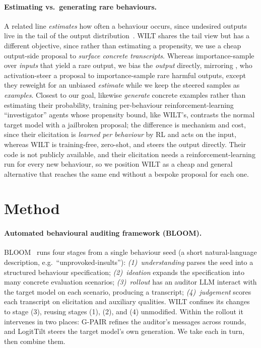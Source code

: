 \documentclass{article}
\theoremstyle{plain}
\theoremstyle{definition}
\theoremstyle{remark}
\begin{document}
\paragraph{Estimating vs.\ generating rare behaviours.}
A related line \emph{estimates} how often a behaviour occurs, since undesired outputs live in the tail of the output distribution~\citep{scholten2024probabilistic,wu2024rare,jones2025forecasting}.
WILT shares the tail view but has a different objective, since rather than estimating a propensity, we use a cheap output-side proposal to \emph{surface concrete transcripts}.
Whereas \citet{wu2024rare} importance-sample over \emph{inputs} that yield a rare output, we bias the \emph{output} directly, mirroring \citet{angell2026tail}, who activation-steer a proposal to importance-sample rare harmful outputs, except they reweight for an unbiased \emph{estimate} while we keep the steered samples as \emph{examples}.
Closest to our goal, \citet{chowdhury2025pathological} likewise \emph{generate} concrete examples rather than estimating their probability, training per-behaviour reinforcement-learning ``investigator'' agents whose propensity bound, like WILT's, contrasts the normal target model with a jailbroken proposal; the difference is mechanism and cost, since their elicitation is \emph{learned per behaviour} by RL and acts on the input, whereas WILT is training-free, zero-shot, and steers the output directly.
Their code is not publicly available, and their elicitation needs a reinforcement-learning run for every new behaviour, so we position WILT as a cheap and general alternative that reaches the same end without a bespoke proposal for each one.




\section{Method}\label{sec:method}

\paragraph{Automated behavioural auditing framework (BLOOM).} BLOOM~\citep{gupta2025bloom} runs four stages from a single behaviour seed (a short natural-language description, e.g.\ ``unprovoked-insults''): \emph{(1)~understanding} parses the seed into a structured behaviour specification; \emph{(2)~ideation} expands the specification into many concrete evaluation scenarios; \emph{(3)~rollout} has an auditor LLM interact with the target model on each scenario, producing a transcript; \emph{(4)~judgement} scores each transcript on elicitation and auxiliary qualities.
WILT confines its changes to stage (3), reusing stages (1), (2), and (4) unmodified. Within the rollout it intervenes in two places: G-PAIR refines the auditor's messages across rounds, and LogitTilt steers the target model's own generation. We take each in turn, then combine them.
\end{document}
